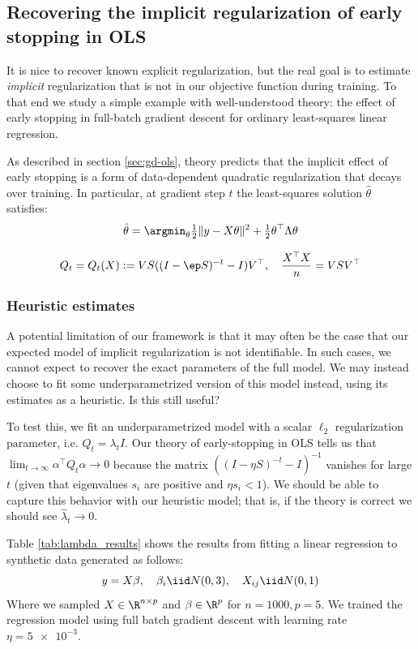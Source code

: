 \documentclass[10pt]{article}
\begin{document}

\subsection{Recovering the implicit regularization of early stopping in OLS}

It is nice to recover known explicit regularization, but the real goal is to estimate \textit{implicit} regularization that is not in our objective function during training. To that end we study a simple example with well-understood theory: the effect of early stopping in full-batch gradient descent for ordinary least-squares linear regression.

As described in section \ref{sec:gd-ols}, theory predicts that the implicit effect of  early stopping is a form of data-dependent quadratic regularization that decays over training. In particular, at gradient step $t$ the least-squares solution $\hat{\theta}$ satisfies:
\[\hat{\theta} = \argmin_\theta \tfrac{1}{2}\| y - X \theta \|^2 + \tfrac{1}{2} \theta^\top \Lambda \theta \]

$$Q_t  = Q_t(X):= V S((I-\ep S)^{-t} - I) V^\top, \quad \frac{X^\top X}{n}= VSV^\top$$


\subsubsection{Heuristic estimates}\label{subsubsec:heuristic-ests}
A potential limitation of our framework is that it may often be the case that our expected model of implicit regularization is not identifiable. In such cases, we cannot expect to recover the exact parameters of the full model. We may instead choose to fit some underparametrized version of this model instead, using its estimates as a heuristic. Is this still useful?

To test this, we fit an underparametrized model with a scalar $\ell_2$ regularization parameter, i.e. $Q_t = \lambda_t I$. Our theory of early-stopping in OLS tells us that $\lim_{t\to \infty} \alpha^\top Q_t \alpha \to 0$ because the matrix $\left((I-\eta S)^{-t}-I\right)^{-1}$ vanishes for large $t$ (given that eigenvalues $s_i$ are positive and $\eta s_i < 1$). We should be able to capture this behavior with our heuristic model; that is, if the theory is correct we should see $\hat{\lambda}_t \to 0$.

Table \ref{tab:lambda_results} shows the results from fitting a linear regression to synthetic data generated as follows:
\[ y = X \beta, \quad \beta_i \iid N(0,3), \quad X_{ij} \iid N(0,1) \]
Where we sampled $X \in \R^{n \times p}$ and $\beta \in \R^p$ for $n=1000, p=5$. We trained the regression model using full batch gradient descent with learning rate $\eta=\num{5e-3} $.
\end{document}
